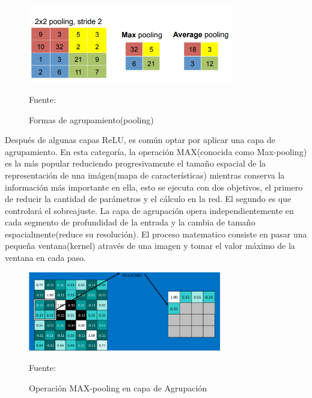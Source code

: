 		\begin{figure}[H]
		\begin{center}
		\includegraphics[width=0.8\textwidth]{images/marcoteorico/pooling}
		\end{center}
		\begin{center}
		\caption{\small{Formas de agrupamiento(pooling)}}
		\vskip -0.2cm  
		{\small{Fuente: \cite{caffe}}}
		\end{center}
		\vspace{-1.5em}
		\end{figure}

		Después de algunas capas ReLU, es común optar por aplicar una capa de agrupamiento. En esta categoría, la operación MAX(conocida como Max-pooling) es la más popular reduciendo progresivamente el tamaño espacial de la representación de una imágen(mapa de características) mientras conserva la información más importante en ella, esto se ejecuta con dos objetivos, el primero de reducir la cantidad de parámetros y el cálculo en la red. El segundo es que controlará el sobreajuste.
		\vskip 0.4cm 
		La capa de agrupación opera independientemente en cada segmento de profundidad de la entrada y la cambia de tamaño espacialmente(reduce su resolución). El proceso matematico consiste en pasar una pequeña ventana(kernel) através de una imagen y tomar el valor máximo de la ventana en cada paso. 


		\begin{figure}[H]
		\begin{center}
		\includegraphics[width=0.75\textwidth]{images/marcoteorico/pool1}
		\end{center}
		\begin{center}
		\caption{\small{Operación MAX-pooling en capa de Agrupación}}
		\vskip -0.2cm  
		{\small{Fuente: \cite{Rohrer}}}
		\end{center}
		\vspace{-1.5em}
		\end{figure}


